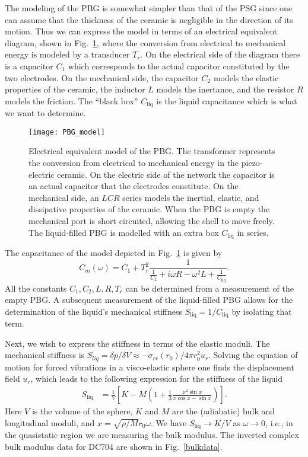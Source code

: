 \documentclass[reprint,showpacs,amsmath,amssymb,aip,jcp]{revtex4-1}
\begin{document}
The modeling of the PBG is somewhat simpler than that of the PSG since
one can assume that the thickness of the ceramic is negligible in the
direction of its motion. Thus we can express the model in terms of an
electrical equivalent diagram, shown in Fig.\ \ref{PBG_model}, where
the conversion from electrical to mechanical energy is modeled by a
transducer $T_r$. On the electrical side of the diagram there is a
capacitor $C_1$ which corresponds to the actual capacitor constituted
by the two electrodes. On the mechanical side, the capacitor $C_2$
models the elastic properties of the ceramic, the inductor $L$ models
the inertance, and the resistor $R$ models the friction. The ``black
box'' $C_{\textrm{liq}}$ is the liquid capacitance which is what we want to
determine.

\begin{figure}
  \texttt{[image: PBG\_model]}
  \caption{\label{PBG_model}Electrical equivalent model of the
    PBG. The transformer represents the conversion from electrical to
    mechanical energy in the piezo-electric ceramic. On the electric
    side of the network the capacitor is an actual capacitor that the
    electrodes constitute. On the mechanical side, an $LCR$ series
    models the inertial, elastic, and dissipative properties of the
    ceramic. When the PBG is empty the mechanical port is short
    circuited, allowing the shell to move freely. The liquid-filled
    PBG is modelled with an extra box $C_{\textrm{liq}}$ in series.}
\end{figure}

The capacitance of the model depicted in Fig.\ \ref{PBG_model} is given
by
\begin{equation}\label{pbgmath}
  C_m(\omega) = C_1 +  T_r^2 \frac{1}{\frac{1}{C_2} + i\omega R - \omega^2L +
    \frac{1}{C_{\text{liq}}}}.
\end{equation}
All the constants $C_1,C_2,L,R,T_r$ can be determined from a
measurement of the empty PBG. A subsequent measurement of the
liquid-filled PBG allows for the determination of the liquid's
mechanical stiffness $S_{\textrm{liq}}=1/C_{\textrm{liq}}$ by
isolating that term.

Next, we wish to express the stiffness in terms of the elastic
moduli. The mechanical stiffness is $S_{liq}= \delta p / \delta V
\approx -\sigma_{rr}(r_0)/4\pi r_0^2u_r$. Solving the equation of
motion for forced vibrations in a visco-elastic sphere one finds the
displacement field $u_r$, which leads to the following expression for
the stiffness of the liquid \cite{sChristensen1994b}
\begin{equation}\label{stiffness}
\begin{split}
  S_{\textrm{liq}} & = \frac{1}{V}\left[K - M \left( 1 + \frac{1}{3} \frac{x^2
        \sin x}{x\cos x-\sin x}\right) \right].
\end{split}
\end{equation}
Here $V$ is the volume of the sphere, $K$ and $M$ are the (adiabatic)
bulk and longitudinal moduli, and $x=\sqrt{\rho/M}r_0\omega$. We have
$S_{\textrm{liq}} \rightarrow K/V$ as $\omega\rightarrow 0$, i.e., in the
quasistatic region we are measuring the bulk modulus. The inverted
complex bulk modulus data for DC704 are shown in Fig.\ \ref{bulkdata}.
\end{document}
